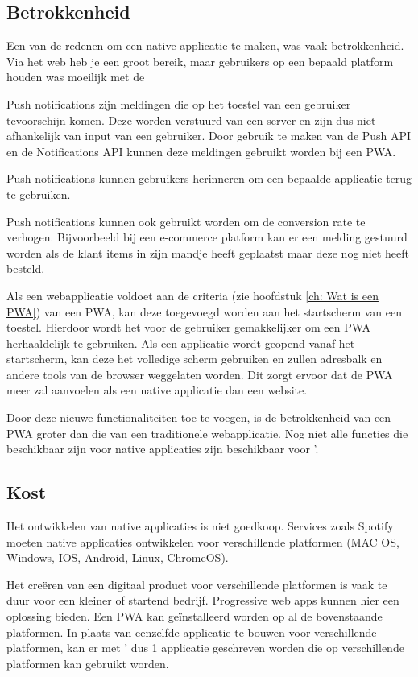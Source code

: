 	
\subsection{Betrokkenheid}
	Een van de redenen om een native applicatie te maken, was vaak betrokkenheid. Via het web heb je een groot bereik, maar gebruikers op een bepaald platform houden was moeilijk met de
	\autocite{Google2019}


	
	Push notifications zijn meldingen die op het toestel van een gebruiker tevoorschijn komen. Deze worden verstuurd van een server en zijn dus niet afhankelijk van input van een gebruiker. Door gebruik te maken van de Push API en de Notifications API kunnen deze meldingen gebruikt worden bij een PWA.
	
	Push notifications kunnen gebruikers herinneren om een bepaalde applicatie terug te gebruiken. 
	
	Push notifications kunnen ook gebruikt worden om de conversion rate te verhogen. Bijvoorbeeld bij een e-commerce platform kan er een melding gestuurd worden als de klant items in zijn mandje heeft geplaatst maar deze nog niet heeft besteld.
	\autocite{Gaunt2020}
	\autocite{Hiltunen2018}

	
	Als een webapplicatie voldoet aan de criteria (zie hoofdstuk \ref{ch: Wat is een PWA}) van een PWA, kan deze toegevoegd worden aan het startscherm van een toestel. Hierdoor wordt het voor de gebruiker gemakkelijker om een PWA herhaaldelijk te gebruiken. Als een applicatie wordt geopend vanaf het startscherm, kan deze het volledige scherm gebruiken en zullen adresbalk en andere tools van de browser weggelaten worden. Dit zorgt ervoor dat de PWA meer zal aanvoelen als een native applicatie dan een website.
	
	Door deze nieuwe functionaliteiten toe te voegen, is de betrokkenheid van een PWA groter dan die van een traditionele webapplicatie. Nog niet alle functies die beschikbaar zijn voor native applicaties zijn beschikbaar voor '.
	

\subsection{Kost}
	Het ontwikkelen van native applicaties is niet goedkoop. Services zoals Spotify moeten native applicaties ontwikkelen voor verschillende platformen (MAC OS, Windows, IOS, Android, Linux, ChromeOS).
	
	Het creëren van een digitaal product voor verschillende platformen is vaak te duur voor een kleiner of startend bedrijf. Progressive web apps kunnen hier een oplossing bieden. Een PWA kan geïnstalleerd worden op al de bovenstaande platformen. In plaats van eenzelfde applicatie te bouwen voor verschillende platformen, kan er met ' dus 1 applicatie geschreven worden die op verschillende platformen kan gebruikt worden.
	
